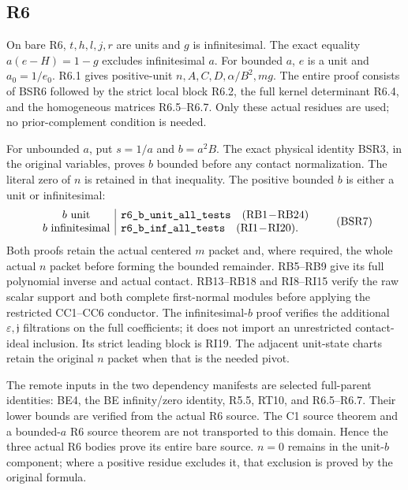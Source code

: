 \subsection{R6}

On bare R6, \(t,h,l,j,r\) are units and \(g\) is
infinitesimal.  The exact equality
\(a(e-H)=1-g\) excludes infinitesimal \(a\).
For bounded \(a\), \(e\) is a unit and \(a_0=1/e_0\).
R6.1 gives positive-unit \(n,A,C,D,\alpha/B^2,mg\).
The entire proof consists of BSR6 followed by the strict
local block R6.2, the full kernel determinant R6.4,
and the homogeneous matrices R6.5--R6.7.
Only these actual residues are used; no prior-complement
condition is needed.

For unbounded \(a\), put \(s=1/a\) and \(b=a^2B\).
The exact physical identity BSR3, in the original variables,
proves \(b\) bounded before any contact normalization.
The literal zero of \(n\) is retained in that inequality.
The positive bounded \(b\) is either a unit or infinitesimal:
\[
 \begin{array}{c|l}
 b\text{ unit}&\texttt{r6\_b\_unit\_all\_tests}
                       \quad({\rm RB1\!-\!RB24})\\
 b\text{ infinitesimal}&\texttt{r6\_b\_inf\_all\_tests}
                       \quad({\rm RI1\!-\!RI20}).
 \end{array}
 \tag{BSR7}
\]
Both proofs retain the actual centered \(m\) packet and,
where required, the whole actual \(n\) packet before forming
the bounded remainder.  RB5--RB9 give its full polynomial
inverse and actual contact.  RB13--RB18 and RI8--RI15
verify the raw scalar support and both complete first-normal
modules before applying the restricted CC1--CC6 conductor.
The infinitesimal-\(b\) proof verifies the additional
\(\varepsilon,\mathfrak j\) filtrations on the full coefficients;
it does not import an unrestricted contact-ideal inclusion.
Its strict leading block is RI19.
The adjacent unit-state charts retain the original \(n\)
packet when that is the needed pivot.

The remote inputs in the two dependency manifests are
selected full-parent identities: BE4, the BE infinity/zero
identity, R5.5, RT10, and R6.5--R6.7.
Their lower bounds are verified from the actual R6 source.
The C1 source theorem and a bounded-\(a\) R6 source
theorem are not transported to this domain.
Hence the three actual R6 bodies prove its entire bare
source.  \(n=0\) remains in the unit-\(b\) component;
where a positive residue excludes it, that exclusion is
proved by the original formula.


